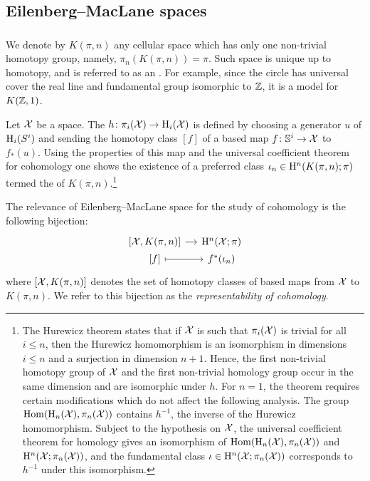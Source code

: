 \subsection{Eilenberg--MacLane spaces}

\subsubsection{}

We denote by $K(\pi, n)$ any cellular space which has only one non-trivial homotopy group, namely, $\pi_n(K(\pi, n)) = \pi$.
Such space is unique up to homotopy, and is referred to as an .
For example, since the circle has universal cover the real line and fundamental group isomorphic to $\mathbb{Z}$, it is a model for $K(\mathbb{Z},1)$.

Let $\mathcal{X}$ be a space.
The  $h \colon \pi_i(\mathcal{X}) \to \mathrm{H}_i(\mathcal{X})$ is defined by choosing a generator $u$ of $\mathrm{H}_i(S^i)$ and sending the homotopy class $[f]$ of a based map $f \colon \mathbb{S}^i \to \mathcal{X}$ to $f_*(u)$.
Using the properties of this map and the universal coefficient theorem for cohomology one shows the existence of a preferred class $\iota_n \in \mathrm{H}^n(K(\pi, n); \pi)$ termed the  of $K(\pi, n)$.\footnote{The Hurewicz theorem states that if $\mathcal{X}$ is such that $\pi_i(\mathcal{X})$ is trivial for all $i \leq n$, then the Hurewicz homomorphism is an isomorphism in dimensions $i \leq n$ and a surjection in dimension $n+1$.
	Hence, the first non-trivial homotopy group of $\mathcal{X}$ and the first non-trivial homology group occur in the same dimension and are isomorphic under $h$.
	For $n=1$, the theorem requires certain modifications which do not affect the following analysis.
	The group $\mathrm{Hom}(\mathrm{H}_n(\mathcal{X}), \pi_n(\mathcal{X}))$ contains $h^{-1}$, the inverse of the Hurewicz homomorphism.
	Subject to the hypothesis on $\mathcal{X}$, the universal coefficient theorem for homology gives an isomorphism of $\mathrm{Hom}(\mathrm{H}_n(\mathcal{X}), \pi_n(\mathcal{X}))$ and $\mathrm{H}^n(\mathcal{X}; \pi_n(\mathcal{X}))$, and the fundamental class $\iota \in \mathrm{H}^n(\mathcal{X}; \pi_n(\mathcal{X}))$ corresponds to $h^{-1}$ under this isomorphism.}

The relevance of Eilenberg--MacLane space for the study of cohomology is the following bijection:
\[
\begin{tikzcd}[column sep=small, row sep=0]
	{[\cX, K(\pi, n)]} \rar & \rH^n(\cX; \pi) \\
	{[f]} \rar[maps to] & f^*(\iota_n)
\end{tikzcd}
\]
where $[\mathcal{X}, K(\pi, n)]$ denotes the set of homotopy classes of based maps from $\mathcal{X}$ to $K(\pi, n)$.
We refer to this bijection as the \textit{representability of cohomology}.

